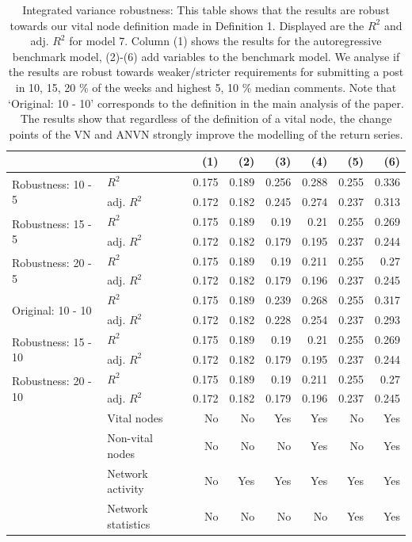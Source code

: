 \begin{table}[ht]
\centering
\caption{Integrated variance robustness: This table shows that the results are robust towards our vital node definition made in 
                    Definition 1. Displayed are the $R^2$ and adj. $R^2$ for model 7. Column (1) shows the results for the autoregressive benchmark model, (2)-(6) add variables to the benchmark model. 
                    We analyse if the results are robust towards weaker/stricter requirements for submitting a post 
                    in {10, 15, 20} \% of the weeks and highest {5, 10} \% median comments. Note that `Original: 10 - 10' corresponds to the 
                    definition in the main analysis of the paper. The results show that regardless of the definition of 
                    a vital node, the change points of the VN and ANVN strongly improve the modelling of the return series.} 
\label{table_r2_iv_robust}
\begingroup\scriptsize
\begin{tabular}{ll|rrrrrr}
  \hline
\hline
  &   & (1) & (2) & (3) & (4) & (5) & (6) \\ 
  \hline
\multirow{2}{*}{Robustness: 10 - 5} & $R^2$ & 0.175 & 0.189 & 0.256 & 0.288 & 0.255 & 0.336 \\ 
    & adj. $R^2$ & 0.172 & 0.182 & 0.245 & 0.274 & 0.237 & 0.313 \\ 
   \hline
\multirow{2}{*}{Robustness: 15 - 5} & $R^2$ & 0.175 & 0.189 & 0.19 & 0.21 & 0.255 & 0.269 \\ 
    & adj. $R^2$ & 0.172 & 0.182 & 0.179 & 0.195 & 0.237 & 0.244 \\ 
   \hline
\multirow{2}{*}{Robustness: 20 - 5} & $R^2$ & 0.175 & 0.189 & 0.19 & 0.211 & 0.255 & 0.27 \\ 
    & adj. $R^2$ & 0.172 & 0.182 & 0.179 & 0.196 & 0.237 & 0.245 \\ 
   \hline
\multirow{2}{*}{Original: 10 - 10} & $R^2$ & 0.175 & 0.189 & 0.239 & 0.268 & 0.255 & 0.317 \\ 
    & adj. $R^2$ & 0.172 & 0.182 & 0.228 & 0.254 & 0.237 & 0.293 \\ 
   \hline
\multirow{2}{*}{Robustness: 15 - 10} & $R^2$ & 0.175 & 0.189 & 0.19 & 0.21 & 0.255 & 0.269 \\ 
    & adj. $R^2$ & 0.172 & 0.182 & 0.179 & 0.195 & 0.237 & 0.244 \\ 
   \hline
\multirow{2}{*}{Robustness: 20 - 10} & $R^2$ & 0.175 & 0.189 & 0.19 & 0.211 & 0.255 & 0.27 \\ 
    & adj. $R^2$ & 0.172 & 0.182 & 0.179 & 0.196 & 0.237 & 0.245 \\ 
   \hline & Vital nodes & No & No & Yes & Yes & No & Yes \\ & Non-vital nodes & No & No & No & Yes & No & Yes \\ & Network activity & No & Yes & Yes & Yes & Yes & Yes \\ & Network statistics & No & No & No & No & Yes & Yes \\ \hline
\hline
\end{tabular}
\endgroup
\end{table}
